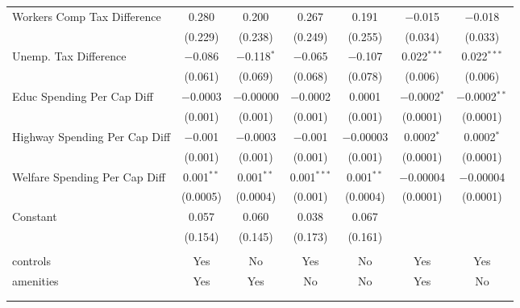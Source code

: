 \begin{table}[!htbp]
\begin{tabular}{@{\extracolsep{5pt}}lcccccc}
  Workers Comp Tax Difference & 0.280 & 0.200 & 0.267 & 0.191 & $-$0.015 & $-$0.018 \\ 
  & (0.229) & (0.238) & (0.249) & (0.255) & (0.034) & (0.033) \\ 
  Unemp. Tax Difference & $-$0.086 & $-$0.118$^{*}$ & $-$0.065 & $-$0.107 & 0.022$^{***}$ & 0.022$^{***}$ \\ 
  & (0.061) & (0.069) & (0.068) & (0.078) & (0.006) & (0.006) \\ 
  Educ Spending Per Cap Diff & $-$0.0003 & $-$0.00000 & $-$0.0002 & 0.0001 & $-$0.0002$^{*}$ & $-$0.0002$^{**}$ \\ 
  & (0.001) & (0.001) & (0.001) & (0.001) & (0.0001) & (0.0001) \\ 
  Highway Spending Per Cap Diff & $-$0.001 & $-$0.0003 & $-$0.001 & $-$0.00003 & 0.0002$^{*}$ & 0.0002$^{*}$ \\ 
  & (0.001) & (0.001) & (0.001) & (0.001) & (0.0001) & (0.0001) \\ 
  Welfare Spending Per Cap Diff & 0.001$^{**}$ & 0.001$^{**}$ & 0.001$^{***}$ & 0.001$^{**}$ & $-$0.00004 & $-$0.00004 \\ 
  & (0.0005) & (0.0004) & (0.001) & (0.0004) & (0.0001) & (0.0001) \\ 
  Constant & 0.057 & 0.060 & 0.038 & 0.067 &  &  \\ 
  & (0.154) & (0.145) & (0.173) & (0.161) &  &  \\ 
 \hline \\[-1.8ex] 
controls & Yes & No & Yes & No & Yes & Yes \\ 
amenities & Yes & Yes & No & No & Yes & No \\ 
\hline \\[-1.8ex] 
\hline 
\hline \\[-1.8ex] 
\end{tabular} 
\end{table} 
